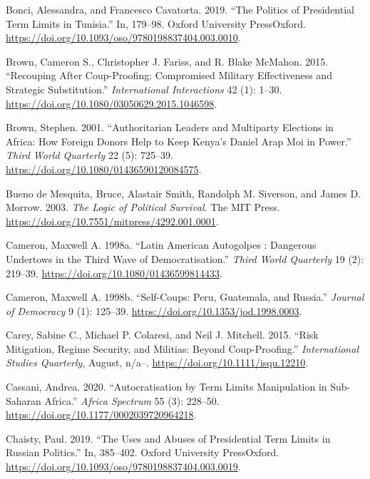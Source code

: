 \documentclass[
  12pt,
]{report}
\newlength{\cslhangindent}
\newenvironment{CSLReferences}[2] %
 {\begin{list}{}{%
  \setlength{\itemindent}{0pt}
  \setlength{\leftmargin}{0pt}
  \setlength{\parsep}{0pt}
  \ifodd #1
   \setlength{\leftmargin}{\cslhangindent}
   \setlength{\itemindent}{-1\cslhangindent}
  \fi
  \setlength{\itemsep}{#2\baselineskip}}}
 {\end{list}}
\begin{document}
\begin{CSLReferences}{1}{0}
Bonci, Alessandra, and Francesco Cavatorta. 2019. {``The Politics of
Presidential Term Limits in Tunisia.''} In, 179--98. Oxford University
PressOxford. \url{https://doi.org/10.1093/oso/9780198837404.003.0010}.

Brown, Cameron S., Christopher J. Fariss, and R. Blake McMahon. 2015.
{``Recouping After Coup-Proofing: Compromised Military Effectiveness and
Strategic Substitution.''} \emph{International Interactions} 42 (1):
1--30. \url{https://doi.org/10.1080/03050629.2015.1046598}.

Brown, Stephen. 2001. {``Authoritarian Leaders and Multiparty Elections
in Africa: How Foreign Donors Help to Keep Kenya's Daniel Arap Moi in
Power.''} \emph{Third World Quarterly} 22 (5): 725--39.
\url{https://doi.org/10.1080/01436590120084575}.

Bueno de Mesquita, Bruce, Alastair Smith, Randolph M. Siverson, and
James D. Morrow. 2003. \emph{The Logic of Political Survival}. The MIT
Press. \url{https://doi.org/10.7551/mitpress/4292.001.0001}.

Cameron, Maxwell A. 1998a. {``Latin American Autogolpes : Dangerous
Undertows in the Third Wave of Democratisation.''} \emph{Third World
Quarterly} 19 (2): 219--39.
\url{https://doi.org/10.1080/01436599814433}.

Cameron, Maxwell A. 1998b. {``Self-Coups: Peru, Guatemala, and
Russia.''} \emph{Journal of Democracy} 9 (1): 125--39.
\url{https://doi.org/10.1353/jod.1998.0003}.

Carey, Sabine C., Michael P. Colaresi, and Neil J. Mitchell. 2015.
{``Risk Mitigation, Regime Security, and Militias: Beyond
Coup-Proofing.''} \emph{International Studies Quarterly}, August, n/a--.
\url{https://doi.org/10.1111/isqu.12210}.

Cassani, Andrea. 2020. {``Autocratisation by Term Limits Manipulation in
Sub-Saharan Africa.''} \emph{Africa Spectrum} 55 (3): 228--50.
\url{https://doi.org/10.1177/0002039720964218}.

Chaisty, Paul. 2019. {``The Uses and Abuses of Presidential Term Limits
in Russian Politics.''} In, 385--402. Oxford University PressOxford.
\url{https://doi.org/10.1093/oso/9780198837404.003.0019}.


\end{CSLReferences}
\end{document}
